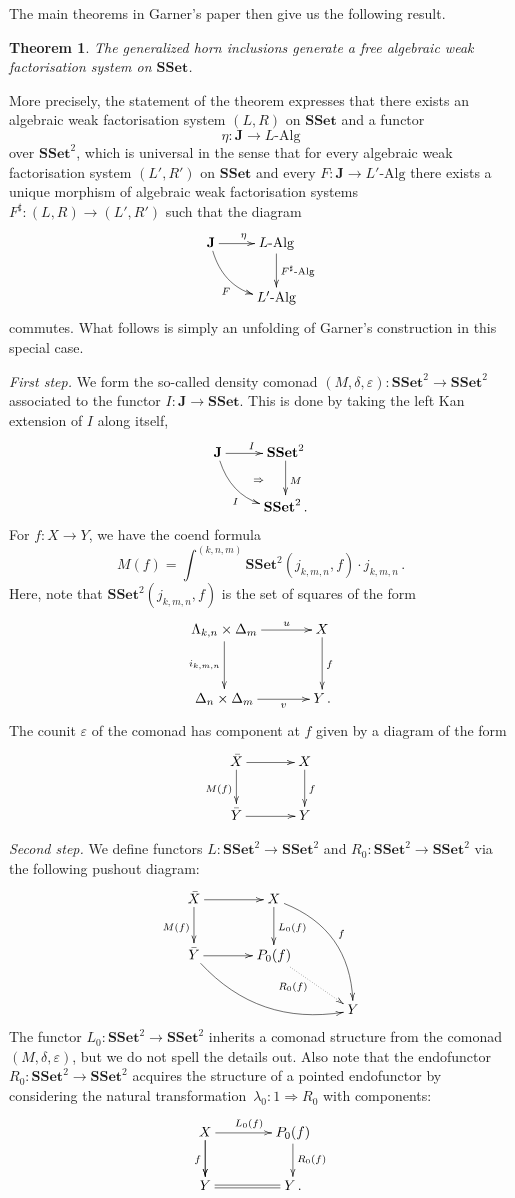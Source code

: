 \documentclass[reqno,10pt,a4paper,oneside]{amsart}
\newcommand{\LAlg}{L\text{-}\mathrm{Alg}}
\newcommand{\LLAlg}{L'\text{-}\mathrm{Alg}}
\newtheorem{theorem}{Theorem}[section]
\theoremstyle{definition}
\newcommand{\co}{\colon}
\newcommand{\SSet}{\mathbf{SSet}}
\begin{document}
 The main theorems in Garner's paper then give us the following result.
 
 \begin{theorem} The generalized horn inclusions generate a free algebraic weak factorisation system on $\SSet$. \end{theorem}
 
 More precisely, the statement of the theorem expresses that there exists an algebraic weak factorisation system
 $(L, R)$ on $\SSet$ and a functor
 \[
 \eta \co \mathbf{J} \to \LAlg
 \]
 over $\SSet^2$, which is universal in the sense that 
 for every algebraic weak factorisation system $(L', R')$ on $\SSet$ and every $F \co \mathbf{J} \to \LLAlg$ there exists a unique
 morphism of algebraic weak factorisation systems $F^\sharp \co (L, R) \to (L', R')$ such that the diagram
 \[
 \xymatrix{
 \mathbf{J} \ar[r]^{\eta} \ar@/_1pc/[dr]_{F} & \LAlg \ar[d]^{F^\sharp\text{-}{\mathrm{Alg}}}  \\
  & \LLAlg}
  \] 
  commutes. What follows is simply an unfolding
 of Garner's construction in this special case. 
 
 \medskip
 
  \noindent
 {\itshape First step.} We form the so-called density comonad $(M, \delta, \varepsilon)  \co \SSet^2 \to \SSet^2$ 
 associated to the functor $I \co \mathbf{J} \to \SSet$.  This is done by taking the left Kan extension of $I$ along itself, 
 \[
 \xymatrix{
 \mathbf{J} \ar@/_1pc/[dr]_I \ar[r]^I  \ar@{}[dr]|{\quad \Rightarrow}  & \SSet^2 \ar[d]^{M} \\
  & \SSet^2 \, . }
  \]
 For $f \co X \to Y$, we have the coend formula
\[
M(f) = 
\int^{(k,n,m)} \SSet^2( j_{k,m,n}, f )  \cdot j_{k,m,n} \, .
\] 
Here, note that $\SSet^2( j_{k,m,n}, f )$ is  the set of squares of the form
\[
\xymatrix@C=1.2cm@R=1.2cm{
 \Lambda_{k,n} \times \Delta_m \ar[r]^-u \ar[d]_{i_{k,m,n}} & X \ar[d]^f \\
 \Delta_{n} \times \Delta_m \ar[r]_-v   &  Y \, .}
 \]
 The counit $\varepsilon$ of the comonad has component at $f$ given by a diagram of the form
 \[
 \xymatrix@C=1.2cm{
  \bar{X} \ar[r]  \ar[d]_{M(f)} & X \ar[d]^f \\
  \bar{Y} \ar[r]  & Y }
  \]
 
 
 \medskip
 
 \noindent
 {\itshape Second step.} We define functors $L \co
 \SSet^2 \to \SSet^2$ and $R_0 \co \SSet^2 \to \SSet^2$    via the following pushout diagram:
\[
   \xymatrix@C=1.2cm{
  \bar{X} \ar[r] \ar[d]_{M(f)} & X \ar[d]^{L_0(f)} \ar@/^1.5pc/[ddr]^{f} \\
  \bar{Y} \ar[r] \ar@/_1.5pc/[drr]  & P_0(f) \ar@{.>}[dr]_-(.3){R_0(f)}  \\ 
   & & Y  }
 \]
The functor $L_0 \co  \SSet^2 \to \SSet^2$ inherits a comonad structure from the 
 comonad~$(M, \delta, \varepsilon)$, but we do not spell  the details out.  Also note that the endofunctor
 $R_0 \co \SSet^2 \to \SSet^2$ acquires the structure of a pointed endofunctor by considering the natural
 transformation~$\lambda_0 \co 1  \Rightarrow R_0$ with components:
 \[
 \xymatrix@C=1.4cm{
 X \ar[d]_f \ar[r]^{L_0(f)} \ar[d] & P_0(f) \ar[d]^{R_0(f)} \\
 Y \ar@{=}[r]  & Y \, .}
 \]
 
\end{document}
